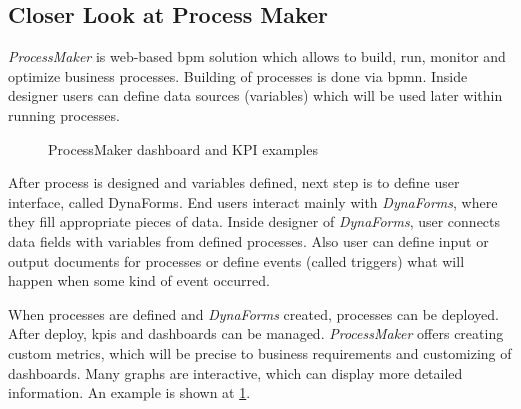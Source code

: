  \subsection{Closer Look at Process Maker}
 
 \textit{ProcessMaker} \cite{processmaker} is web-based \gls{bpm} solution which allows to build, run, monitor and optimize business processes. Building of processes is done via \gls{bpmn}. Inside designer users can define data sources (variables) which will be used later within running processes. 
 
\begin{figure}[ht!]
    \centering
    \qquad
    \caption{ProcessMaker dashboard and KPI examples \cite{processmaker}}%
    \label{fig:process-maker-dashboard}%
\end{figure}

 After process is designed and variables defined, next step is to define user interface, called DynaForms. End users interact mainly with \textit{DynaForms}, where they fill appropriate pieces of data. 
 Inside designer of \textit{DynaForms}, user connects data fields with variables from defined processes. Also user can define input or output documents for processes or define events (called triggers) what will happen when some kind of event occurred.
 
 When processes are defined and \textit{DynaForms} created, processes can be deployed. After deploy, \gls{kpi}s and dashboards can be managed. \textit{ProcessMaker} offers creating custom metrics, which will be precise to business requirements and customizing of dashboards. Many graphs are interactive, which can display more detailed information. An example is shown at \cref{fig:process-maker-dashboard}.
 
